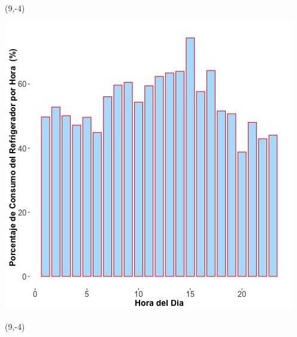 \documentclass{article}\usepackage[]{graphicx}\usepackage[]{color}
\newenvironment{knitrout}{}{} %
\begin{document}
 \begin{textblock}{1}(9,-4)
\begin{minipage}{20em}
\begingroup

\endgroup
\end{minipage}
\end{textblock}

 \vspace{2cm}

\begin{knitrout}
\color{fgcolor}
\includegraphics[scale=0.65]{figure/A20_fridge_energy_pct.jpg} 
\end{knitrout}

 \begin{textblock}{1}(9,-4)
\begin{minipage}{20em}
\begingroup

\endgroup
\end{minipage}
\end{textblock}

\vspace{20cm}
\end{document}
